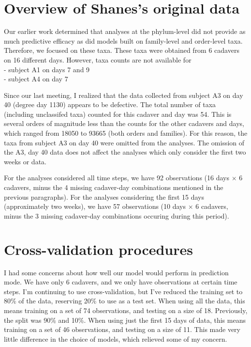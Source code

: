 \documentclass{article}
\begin{document}
\section{Overview of Shanes's original data}

Our earlier work determined that analyses at the phylum-level did not
provide as much predictive efficacy as did models built on
family-level and order-level taxa.  Therefore, we focused on these
taxa.  These taxa were obtained from 6 cadavers on 16 different days.
However, taxa counts are not available for\\
- subject A1 on days 7 and 9\\
- subject A4 on day 7


Since our last meeting, I realized that the data collected from
subject A3 on day 40 (degree day 1130) appears to be defective.  The
total number of taxa (including unclassifed taxa) counted for this
cadaver and day was 54.  This is several orders of magnitude less than
the counts for the other cadavers and days, which ranged from 18050 to
93665 (both orders and families).  For this reason, the taxa from
subject A3 on day 40 were omitted from the analyses.  The omission of
the A3, day 40 data does not affect the analyses which only consider
the first two weeks or data.

For the analyses considered all time steps, we have 92 observations
(16 days $\times$ 6 cadavers, minus the 4 missing cadaver-day
combinations mentioned in the previous paragraphs).  For the analyses
considering the first 15 days (approximately two weeks), we have 57
observations (10 days $\times$ 6 cadavers, minus the 3 missing
cadaver-day combinations occuring during this period).


\section{Cross-validation procedures}

I had some concerns about how well our model would perform in
prediction mode.  We have only 6 cadavers, and we only have
observations at certain time steps.  I'm continuing to use
cross-validation, but I've reduced the training set to 80\% of the
data, reserving 20\% to use as a test set.  When using all the data,
this means training on a set of 74 observations, and testing on a size
of 18.  Previously, the split was 90\% and 10\%.  When using just the
first 15 days of data, this means training on a set of 46 observations,
and testing on a size of 11.  This made very little difference in the
choice of models, which relieved some of my concern.
\end{document}
